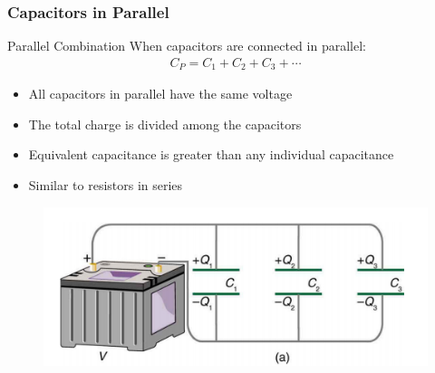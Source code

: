 \documentclass{beamer}
\begin{document}
\begin{frame}
    \frametitle{Capacitors in Parallel}
    
    \begin{block}{Parallel Combination}
        When capacitors are connected in parallel:
        \begin{align}
            C_P = C_1 + C_2 + C_3 + \cdots
        \end{align}
    \end{block}
    
    \begin{itemize}
        \item All capacitors in parallel have the same voltage
        \item The total charge is divided among the capacitors
        \item Equivalent capacitance is greater than any individual capacitance
        \item Similar to resistors in series
    \end{itemize}
    
    \begin{center}
   
      \begin{figure}
          \centering
          \includegraphics[width=0.5\linewidth]{phys12-circuits-capacitors-in-parallel.png}
      \end{figure}
    \end{center}
\end{frame}
\end{document}
